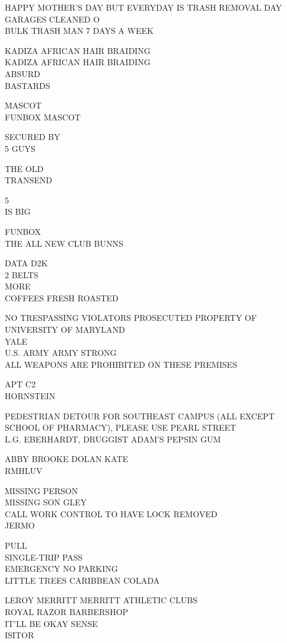 \documentclass[10pt,letterpaper]{article}
\begin{document}
HAPPY MOTHER'S DAY BUT EVERYDAY IS TRASH REMOVAL DAY\\
GARAGES CLEANED O\\
BULK TRASH MAN 7 DAYS A WEEK

KADIZA AFRICAN HAIR BRAIDING\\
KADIZA AFRICAN HAIR BRAIDING\\
ABSURD\\
BASTARDS

MASCOT\\
FUNBOX MASCOT

SECURED BY\\
5 GUYS

THE OLD\\
TRANSEND

5\\
IS BIG

FUNBOX\\
THE ALL NEW CLUB BUNNS

DATA D2K\\
2 BELTS\\
MORE\\
COFFEES FRESH ROASTED

NO TRESPASSING VIOLATORS PROSECUTED PROPERTY OF UNIVERSITY OF MARYLAND\\
YALE\\
U.S. ARMY ARMY STRONG\\
ALL WEAPONS ARE PROHIBITED ON THESE PREMISES

APT C2\\
HORNSTEIN

PEDESTRIAN DETOUR FOR SOUTHEAST CAMPUS (ALL EXCEPT SCHOOL OF PHARMACY), PLEASE USE PEARL STREET\\
L.G. EBERHARDT, DRUGGIST ADAM'S PEPSIN GUM

ABBY BROOKE DOLAN KATE\\
RMHLUV

MISSING PERSON\\
MISSING SON GLEY\\
CALL WORK CONTROL TO HAVE LOCK REMOVED\\
JERMO

PULL\\
SINGLE{-}TRIP PASS\\
EMERGENCY NO PARKING\\
LITTLE TREES CARIBBEAN COLADA

LEROY MERRITT MERRITT ATHLETIC CLUBS\\
ROYAL RAZOR BARBERSHOP\\
IT'LL BE OKAY SENSE\\
ISITOR
\end{document}
